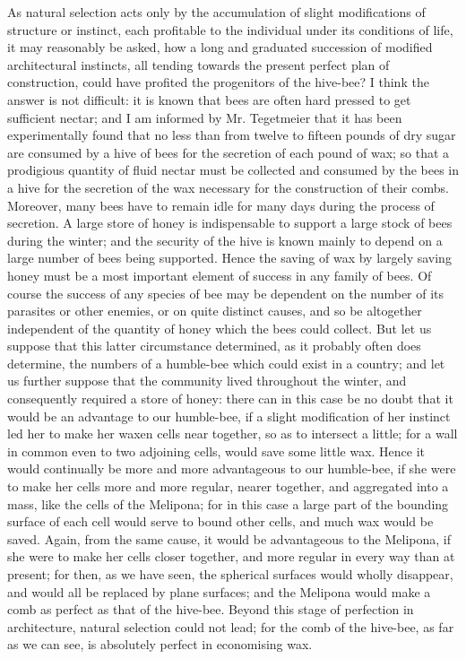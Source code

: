 \indent As natural selection acts only by the accumulation of slight modifications of structure or instinct, each profitable to the individual under its conditions of life, it may reasonably be asked, how a long and graduated succession of modified architectural instincts, all tending towards the present perfect plan of construction, could have profited the progenitors of the hive-bee? I think the answer is not difficult: it is known that bees are often hard pressed to get sufficient nectar; and I am informed by Mr. Tegetmeier that it has been experimentally found that no less than from twelve to fifteen pounds of dry sugar are consumed by a hive of bees for the secretion of each pound of wax; so that a prodigious quantity of fluid nectar must be collected and consumed by the bees in a hive for the secretion of the wax necessary for the construction of their combs. Moreover, many bees have to remain idle for many days during the process of secretion. A large store of honey is indispensable to support a large stock of bees during the winter; and the security of the hive is known mainly to depend on a large number of bees being supported. Hence the saving of wax by largely saving honey must be a most important element of success in any family of bees. Of course the success of any species of bee may be dependent on the number of its parasites or other enemies, or on quite distinct causes, and so be altogether independent of the quantity of honey which the bees could collect. But let us suppose that this latter circumstance determined, as it probably often does determine, the numbers of a humble-bee which could exist in a country; and let us further suppose that the community lived throughout the winter, and consequently required a store of honey: there can in this case be no doubt that it would be an advantage to our humble-bee, if a slight modification of her instinct led her to make her waxen cells near together, so as to intersect a little; for a wall in common even to two adjoining cells, would save some little wax. Hence it would continually be more and more advantageous to our humble-bee, if she were to make her cells more and more regular, nearer together, and aggregated into a mass, like the cells of the Melipona; for in this case a large part of the bounding surface of each cell would serve to bound other cells, and much wax would be saved. Again, from the same cause, it would be advantageous to the Melipona, if she were to make her cells closer together, and more regular in every way than at present; for then, as we have seen, the spherical surfaces would wholly disappear, and would all be replaced by plane surfaces; and the Melipona would make a comb as perfect as that of the hive-bee. Beyond this stage of perfection in architecture, natural selection could not lead; for the comb of the hive-bee, as far as we can see, is absolutely perfect in economising wax.\\
